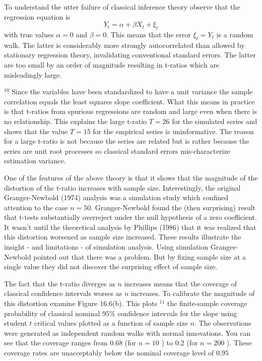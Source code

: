 \documentclass[10pt]{article}
\begin{document}
To understand the utter failure of classical inference theory observe that the regression equation is
$$
Y_{t}=\alpha+\beta X_{t}+\xi_{t}
$$
with true values $\alpha=0$ and $\beta=0$. This means that the error $\xi_{t}=Y_{t}$ is a random walk. The latter is considerably more strongly autocorrelated than allowed by stationary regression theory, invalidating conventional standard errors. The latter are too small by an order of magnitude resulting in t-ratios which are misleadingly large.

${ }^{10}$ Since the variables have been standardized to have a unit variance the sample correlation equals the least squares slope coefficient. What this means in practice is that $\mathrm{t}$-ratios from spurious regressions are random and large even when there is no relationship. This explains the large t-ratio $T=26$ for the simulated series and shows that the value $T=15$ for the empirical series is uninformative. The reason for a large t-ratio is not because the series are related but is rather because the series are unit root processes so classical standard errors mis-characterize estimation variance.

One of the features of the above theory is that it shows that the magnitude of the distortion of the t-ratio increases with sample size. Interestingly, the original Granger-Newbold (1974) analysis was a simulation study which confined attention to the case $n=50$. Granger-Newbold found the (then surprising) result that t-tests substantially overreject under the null hypothesis of a zero coefficient. It wasn't until the theoretical analysis by Phillips (1986) that it was realized that this distortion worsened as sample size increased. These results illustrate the insight - and limitations - of simulation analysis. Using simulation Granger-Newbold pointed out that there was a problem. But by fixing sample size at a single value they did not discover the surprising effect of sample size.

The fact that the t-ratio diverges as $n$ increases means that the coverage of classical confidence intervals worses as $n$ increases. To calibrate the magnitude of this distortion examine Figure 16.6(b). This plots ${ }^{11}$ the finite-sample coverage probability of classical nominal $95 \%$ confidence intervals for the slope using student $t$ critical values plotted as a function of sample size $n$. The observations were generated as independent random walks with normal innovations. You can see that the coverage ranges from $0.68$ (for $n=10$ ) to $0.2$ (for $n=200$ ). These coverage rates are unacceptably below the nominal coverage level of $0.95$
\end{document}
